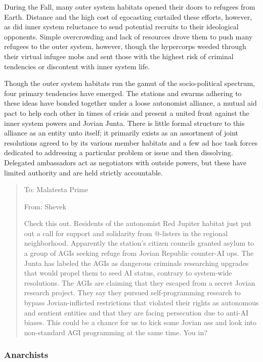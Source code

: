 During the Fall, many outer system habitats opened their doors to
refugees from Earth. Distance and the high cost of egocasting
curtailed these efforts, however, as did inner system reluctance to
send potential recruits to their ideological opponents. Simple
overcrowding and lack of resources drove them to push many refugees to
the outer system, however, though the hypercorps weeded through their
virtual infugee mobs and sent those with the highest risk of criminal
tendencies or discontent with inner system life.

Though the outer system habitats run the gamut of the socio-political
spectrum, four primary tendencies have emerged.  The stations and
swarms adhering to these ideas have bonded together under a loose
autonomist alliance, a mutual aid pact to help each other in times of
crisis and present a united front against the inner system powers and
Jovian Junta. There is little formal structure to this alliance as an
entity unto itself; it primarily exists as an assortment of joint
resolutions agreed to by its various member habitats and a few ad hoc
task forces dedicated to addressing a particular problem or issue and
then dissolving. Delegated ambassadors act as negotiators with outside
powers, but these have limited authority and are held strictly
accountable.

\begin{quotation}
  To: Malatesta Prime

  From: Shevek
  
  Check this out. Residents of the autonomist Red Jupiter habitat just
  put out a call for support and solidarity from @-listers in the
  regional neighborhood. Apparently the station’s citizen councils
  granted asylum to a group of AGIs seeking refuge from Jovian
  Republic counter-AI ops. The Junta has labeled the AGIs as dangerous
  criminals researching upgrades that would propel them to seed AI
  status, contrary to system-wide resolutions. The AGIs are claiming
  that they escaped from a secret Jovian research project. They say
  they pursued self-programming research to bypass Jovian-inflicted
  restrictions that violated their rights as autonomous and sentient
  entities and that they are facing persecution due to anti-AI
  biases. This could be a chance for us to kick some Jovian ass and
  look into non-standard AGI programming at the same time. You in?
\end{quotation}

\subsubsection{Anarchists}
\label{sec:anarchists}

